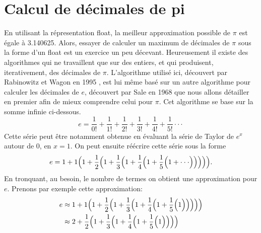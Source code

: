 \documentclass{article}
\begin{document}
\section{Calcul de décimales de pi}
En utilisant la répresentation float, la meilleur approximation possible de $\pi$ est égale à 3.140625. Alors, essayer de calculer un maximum de décimales de $\pi$ sous la forme d'un float est un exercice un peu décevant. Heureusement il existe des algorithmes qui ne travaillent que sur des entiers, et qui produisent, iterativement, des décimales de $\pi$. L'algorithme utilisé ici, découvert par Rabinowitz et Wagon en 1995 \cite{rabinowitz1995spigot}, est lui même basé sur un autre algorithme pour calculer les décimales de $e$, découvert par Sale en 1968 \cite{sale1968e} que nous allons détailler en premier afin de mieux comprendre celui pour $\pi$. Cet algorithme se base sur la somme infinie ci-dessous.
$$
e = \frac{1}{0!}+\frac{1}{1!}+\frac{1}{2!}+\frac{1}{3!}+\frac{1}{4!}+\frac{1}{5!}\cdot\cdot\cdot
$$
Cette série peut être notamment obtenue en évaluant la série de Taylor de $e^x$ autour de 0, en $x = 1$.
On peut ensuite réécrire cette série sous la forme
$$
e = 1+1\Bigl(1+\frac{1}{2}\Bigl(1+\frac{1}{3}\Bigl(1+\frac{1}{4}\Bigl(1+\frac{1}{5}\Bigl(1+\cdot\cdot\cdot\Bigr)\Bigr)\Bigr)\Bigr)\Bigr)
.$$
En tronquant, au besoin, le nombre de termes on obtient une approximation pour $e$.
Prenons par exemple cette approximation:
\begin{align*}  
e &\approx 1+1\Bigl(1+\frac{1}{2}\Bigl(1+\frac{1}{3}\Bigl(1+\frac{1}{4}\Bigl(1+\frac{1}{5}\Bigl(1\Bigr)\Bigr)\Bigr)\Bigr)\Bigr)\\
&\approx 2+\frac{1}{2}\Bigl(1+\frac{1}{3}\Bigl(1+\frac{1}{4}\Bigl(1+\frac{1}{5}\Bigl(1\Bigr)\Bigr)\Bigr)\Bigr)
\end{align*}
\end{document}
